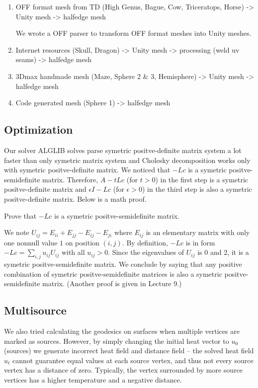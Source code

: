 \documentclass[a4paper,12pt,twoside]{article}
\begin{document}
\begin{enumerate}

\item
OFF format mesh from TD (High Genus, Bague, Cow, Triceratops, Horse) -> Unity mesh -> halfedge mesh

We wrote a OFF parser to transform OFF format meshes into Unity meshes.

\item
Internet resources (Skull, Dragon) -> Unity mesh -> processing (weld uv seams) -> halfedge mesh

\item
3Dmax handmade mesh (Maze, Sphere 2 \& 3, Hemisphere) -> Unity mesh -> halfedge mesh

\item
Code generated mesh (Sphere 1) -> halfedge mesh

\end{enumerate}

\subsection{Optimization}
Our solver ALGLIB solves parse symetric positve-definite matrix system a lot faster than only symetric matrix system and Cholesky decomposition works only with symetric positve-definite matrix.
We noticed that $-Lc$ is a symetric positve-semidefinite matrix.
Therefore, $A-tLc$ (for $t>0$) in the first step is a symetric positve-definite matrix and $\epsilon I-Lc$ (for $\epsilon >0$) in the third step is also a symetric positve-definite matrix. Below is a math proof.

Prove that $-Lc$ is a symetric positve-semidefinite matrix.

We note $U_{ij}=E_{ii}+E_{jj}-E_{ij}-E_{ji}$ where $E_{ij}$ is an elementary matrix with only one nonnull value $1$ on position $(i,j)$. By definition, $-Lc$ is in form  $-Lc=\sum_{i,j}u_{ij}U_{ij}$ with all $u_{ij}>0$. Since the eigenvalues of $U_{ij}$ is $0$ and $2$, it is a symetric positve-semidefinite matrix. We conclude by saying that any positive combination of symetric positve-semidefinite matrices is also a symetric positve-semidefinite matrix. (Another proof is given in Lecture 9.)\\

\subsection{Multisource}

We also tried calculating the geodesics on surfaces when multiple vertices are marked as sources. However, by simply changing the initial heat vector to  $u_0$ (sources) we generate incorrect heat field and distance field – the solved heat field $u_t$ cannot guarantee equal values at each source vertex, and thus not every source vertex has a distance of zero. Typically, the vertex surrounded by more source vertices has a higher temperature and a negative distance.
\end{document}
